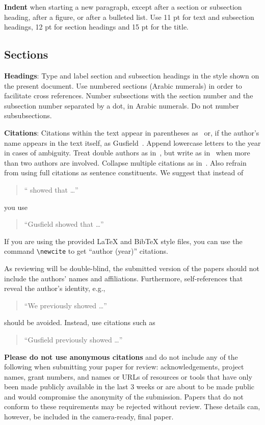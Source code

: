 \documentclass[11pt]{article}
\begin{document}
\textbf{Indent} when starting a new paragraph, except after a section or subsection heading, after a figure, or after a bulleted list. Use 11 pt for text and subsection headings, 12 pt for section headings and 15 pt for the title. 


\subsection{Sections}

\textbf{Headings}: Type and label section and subsection headings in the style shown on the present document. Use numbered sections (Arabic numerals) in order to facilitate cross references. Number subsections with the section number and the subsection number separated by a dot, in Arabic numerals. Do not number subsubsections.

\textbf{Citations}: Citations within the text appear in parentheses
as~\cite{Gusfield:97} or, if the author's name appears in the text itself, as Gusfield~. Append lowercase letters to the year in cases of ambiguity. Treat double authors as in~\cite{Aho:72}, but write as in~\cite{Chandra:81} when more than two authors are involved. Collapse multiple citations as in~\cite{Gusfield:97,Aho:72}. Also refrain from using full citations as sentence constituents. We suggest that instead of
\begin{quote}
  ``\cite{Gusfield:97} showed that \ldots''
\end{quote}
you use
\begin{quote}
``Gusfield    showed that \ldots''
\end{quote}

If you are using the provided LaTeX and BibTeX style files, you
can use the command \verb|\newcite| to get ``author (year)'' citations.

As reviewing will be double-blind, the submitted version of the papers should not include the authors' names and affiliations. Furthermore, self-references that reveal the author's identity, e.g.,
\begin{quote}
``We previously showed \cite{Gusfield:97} \ldots''  
\end{quote}
should be avoided. Instead, use citations such as 
\begin{quote}
``Gusfield 
previously showed \ldots''
\end{quote}

\textbf{Please do not use anonymous citations} and do not include any of the following when submitting your paper for review: acknowledgements, project names, grant numbers, and names or URLs of resources or tools that have only been made publicly available in the last 3 weeks or are about to be made public and would compromise the anonymity of the submission.
Papers that do not conform to these requirements may be rejected without review. These details can, however, be included in the camera-ready, final paper.
\end{document}
